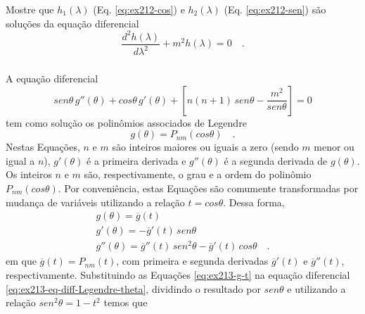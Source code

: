 \documentclass[10pt,a4paper,fleqn]{article}
\begin{document}
Mostre que
$h_{1}(\lambda)$ (Eq. \ref{eq:ex212-cos}) e $h_{2}(\lambda)$ (Eq. \ref{eq:ex212-sen}) 
s\~{a}o soluç\~{o}es da equaç\~{a}o diferencial
\begin{equation}
\frac{d^{2} h(\lambda)}{d \lambda^{2}} + m^{2} h(\lambda) = 0 \quad .
\label{eq:ex212-eqdif-lamb}
\end{equation}

\begin{flushleft}
\dotfill
\end{flushleft}

\subsubsection{}
A equaç\~{a}o diferencial
\begin{equation}
sen \theta \, g''(\theta) + 
cos \theta \, g'(\theta) + 
\left[ n(n+1) \, sen \theta - \dfrac{m^{2}}{sen \theta} \right] = 0
\label{eq:ex213-eq-diff-Legendre-theta}
\end{equation}
tem como soluç\~{a}o os polin\^{o}mios associados de Legendre
\begin{equation}
g(\theta) = P_{nm}(cos\theta) \quad .
\label{eq:ex213-g-theta}
\end{equation}
Nestas Equaç\~{o}es, $n$ e $m$ s\~{a}o inteiros maiores ou iguais a zero (sendo $m$ menor ou igual a $n$), 
$g'(\theta)$ \'{e} a primeira derivada e $g''(\theta)$ \'{e} a segunda derivada de $g(\theta)$. Os inteiros $n$ 
e $m$ s\~{a}o, respectivamente, o grau e a ordem do polin\^{o}mio $P_{nm}(cos\theta)$. Por conveni\^{e}ncia, 
estas Equaç\~{o}es s\~{a}o comumente transformadas por mudança de vari\'{a}veis  utilizando a relaç\~{a}o 
$t = cos{\theta}$. Dessa forma,
\begin{equation}
\begin{array}{l}
g(\theta) = \overline{g}(t) \\
g'(\theta) = -\overline{g}'(t) \, sen \theta \\
g''(\theta) = \overline{g}''(t) \, sen^{2} \theta - \overline{g}'(t) \, cos \theta \quad .
\end{array}
\label{eq:ex213-g-t}
\end{equation}
em que $\overline{g}(t) = P_{nm}(t)$, com primeira e segunda derivadas $\overline{g}'(t)$ e $\overline{g}''(t)$, 
respectivamente. Substituindo as Equaç\~{o}es \ref{eq:ex213-g-t} na equaç\~{a}o diferencial 
\ref{eq:ex213-eq-diff-Legendre-theta}, dividindo o resultado por $sen \theta$ e utilizando a relaç\~{a}o $sen^{2} 
\theta = 1 - t^2$ temos que
\end{document}
